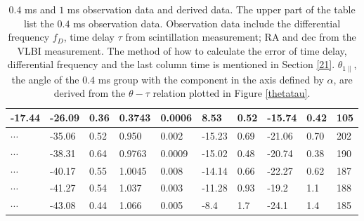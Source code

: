 \documentclass[useAMS,usenatbib]{mn2e}
\begin{document}
\begin{table}
\begin{tabular}{llllllllll}
-17.44   &-26.09                            & 0.36      & 0.3743 & 0.0006         & 8.53    & 0.52                                     & -15.74    & 0.42      &105                               
\\ \hline 
 $\cdots$ &       -35.06                           & 0.52                               & 0.950               & 0.002                              & -15.23  & 0.69                                     & -21.06   & 0.70   &202                                   \\

$\cdots$     & -38.31                           & 0.64                               & 0.9763              & 0.0009                             & -15.02  & 0.48                                    & -20.74   & 0.38  &190                                    \\

  $\cdots$  &-40.17                           & 0.55                               & 1.0045              & 0.008                             & -14.14  & 0.66                                    & -22.27   & 0.62  &187                                   \\

  $\cdots$ &-41.27                           & 0.54                               & 1.037              & 0.003                              & -11.28  & 0.93                                     & -19.2   & 1.1   &188                                   \\

$\cdots$ & -43.08                           & 0.44                               & 1.066              & 0.005                              & -8.4   & 1.7                                      & -24.1   & 1.4   &185   \\
 \hline                                 
\end{tabular}
\label{table:apex}
\caption{$0.4$ ms and $1$ ms observation data and derived data. The upper part of the table list the $0.4$ ms observation data. Observation data include the differential frequency $f_D$, time delay $\tau$ from scintillation measurement; RA and dec from the VLBI measurement. The method of how to calculate the error of time delay, differential frequency and the last column time is mentioned in Section \ref{21}. $\theta_{1\parallel}$, the angle of the $0.4$ ms group with the component in the axis defined by $\alpha$, are derived from the $\theta-\tau$ relation plotted in Figure \ref{thetatau}.}
\end{table}
\end{document}
